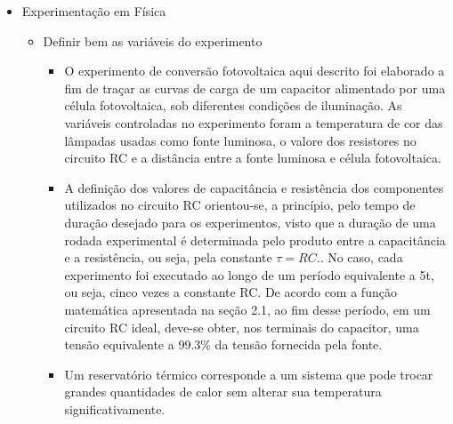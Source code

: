 \documentclass{article}
\begin{document}
\begin{itemize}
\begin{itemize}
\begin{itemize}
			\item Observa-se que estes valores diferem essencialmente na incerteza associada à inclinação de cada uma destas retas, reduzindo com a diminuição do tempo de delay. Este é um estudo bastante interessante que pode ser realizado e debatido em sala de aula, contribuindo no aprendizado em análise estatística e contribuição de erros em medidas físicas. \cite{iniciantes}
			\item A Fig. 10 mostra a influencia do tempo de chaveamento nas medidas realizadas. Nota-se, como esperado, que para tempos maiores temos uma melhor visualização do processo de carga e descarga. No nosso entender esta pode ser mais uma atividade experimental proposta em sala, bastante interessante, pois possibilita ao estudante maior domínio da tecnologia e do sistema de medida utilizado. \cite{iniciantes} \textbf{Mais uma possibilidade de parametrização do experimento para fins didáticos.}
		\end{itemize}
	\end{itemize}
	\item{Experimentação em Física}
	\begin{itemize}
		\item Definir bem as variáveis do experimento
		\begin{itemize}
			\item O experimento de conversão fotovoltaica aqui descrito foi elaborado a fim de traçar as curvas de carga de um capacitor alimentado por uma célula fotovoltaica, sob diferentes condições de iluminação. As variáveis controladas no experimento foram a temperatura de cor das lâmpadas usadas como fonte luminosa, o valore dos resistores no circuito RC e a distância entre a fonte luminosa e célula fotovoltaica. \cite{rogerio}
			\item A definição dos valores de capacitância e resistência dos componentes utilizados no circuito RC orientou-se, a princípio, pelo tempo de duração desejado para os experimentos, visto que a duração de uma rodada experimental é determinada pelo produto entre a capacitância e a resistência, ou seja, pela constante $\tau = RC$.. No caso, cada experimento foi executado ao longo de um período equivalente a 5t, ou seja, cinco vezes a constante RC. De acordo com a função matemática apresentada na seção 2.1, ao fim desse período, em um circuito RC ideal, deve-se obter, nos terminais do capacitor, uma tensão equivalente a 99.3\% da tensão fornecida pela fonte. \cite{rogerio}
			\item Um reservatório térmico corresponde a um sistema que pode trocar grandes quantidades de calor sem alterar sua temperatura significativamente. \cite{newton}

\end{itemize}
\end{itemize}
\end{itemize}
\end{document}
